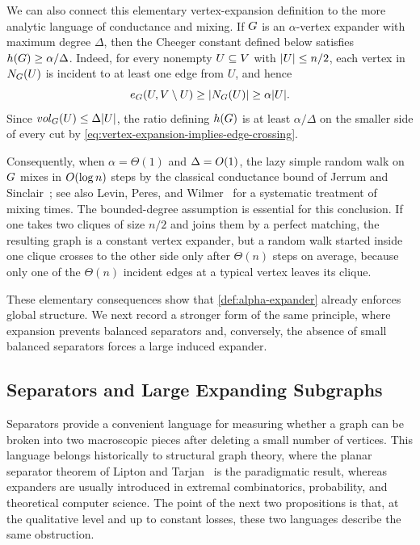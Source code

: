 We can also connect this elementary vertex-expansion definition to the more analytic language of conductance and mixing. If \(G\) is an \(\alpha\)-vertex expander with maximum degree \(\Delta\), then the Cheeger constant defined below satisfies \(h(G)\geq \alpha/\Delta\). Indeed, for every nonempty \(U\subseteq V\) with \(\lvert U\rvert\leq n/2\), each vertex in \(N_{G}(U)\) is incident to at least one edge from \(U\), and hence
\begin{equation}
	\label{eq:vertex-expansion-implies-edge-crossing}
	e_{G}(U,V\setminus U)\geq \lvert N_{G}(U)\rvert\geq \alpha\lvert U\rvert.
\end{equation}
Since \(vol_{G}(U)\leq \Delta\lvert U\rvert\), the ratio defining \(h(G)\) is at least \(\alpha/\Delta\) on the smaller side of every cut by \cref{eq:vertex-expansion-implies-edge-crossing}.

Consequently, when \(\alpha=\Theta(1)\) and \(\Delta=\bigO(1)\), the lazy simple random walk on \(G\) mixes in \(\bigO(\log n)\) steps by the classical conductance bound of Jerrum and Sinclair~\cite{STOC:JerSin88}; see also Levin, Peres, and Wilmer~\cite{LPW2009} for a systematic treatment of mixing times. The bounded-degree assumption is essential for this conclusion. If one takes two cliques of size \(n/2\) and joins them by a perfect matching, the resulting graph is a constant vertex expander, but a random walk started inside one clique crosses to the other side only after \(\Theta(n)\) steps on average, because only one of the \(\Theta(n)\) incident edges at a typical vertex leaves its clique.

These elementary consequences show that \cref{def:alpha-expander} already enforces global structure. We next record a stronger form of the same principle, where expansion prevents balanced separators and, conversely, the absence of small balanced separators forces a large induced expander.

\subsection{Separators and Large Expanding Subgraphs}
\label{subsec:separators-large-expanding-subgraphs}

Separators provide a convenient language for measuring whether a graph can be broken into two macroscopic pieces after deleting a small number of vertices. This language belongs historically to structural graph theory, where the planar separator theorem of Lipton and Tarjan~\cite{LT1979} is the paradigmatic result, whereas expanders are usually introduced in extremal combinatorics, probability, and theoretical computer science. The point of the next two propositions is that, at the qualitative level and up to constant losses, these two languages describe the same obstruction.

